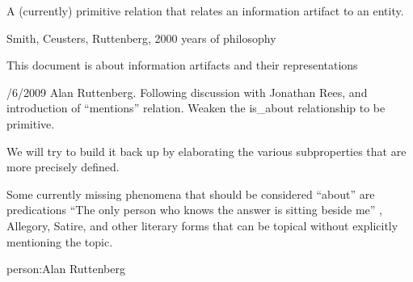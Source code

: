 \documentclass[letterpaper,10pt,english]{sphinxmanual}
\begin{document}
\begin{sphinxShadowBox}

\sphinxAtStartPar
{}
\end{sphinxShadowBox}

\begin{sphinxShadowBox}

\sphinxAtStartPar
A (currently) primitive relation that relates an information artifact to an entity.
\end{sphinxShadowBox}

\begin{sphinxShadowBox}

\sphinxAtStartPar
Smith, Ceusters, Ruttenberg, 2000 years of philosophy
\end{sphinxShadowBox}

\begin{sphinxShadowBox}

\sphinxAtStartPar
This document is about information artifacts and their representations
\end{sphinxShadowBox}

\begin{sphinxShadowBox}

/6/2009 Alan Ruttenberg. Following discussion with Jonathan Rees, and introduction of “mentions” relation. Weaken the is\_about relationship to be primitive.

\sphinxAtStartPar
We will try to build it back up by elaborating the various subproperties that are more precisely defined.

\sphinxAtStartPar
Some currently missing phenomena that should be considered “about” are predications \sphinxhyphen{} “The only person who knows the answer is sitting beside me” , Allegory, Satire, and other literary forms that can be topical without explicitly mentioning the topic.
\end{sphinxShadowBox}

\begin{sphinxShadowBox}

\sphinxAtStartPar
{}
\end{sphinxShadowBox}

\begin{sphinxShadowBox}

\sphinxAtStartPar
person:Alan Ruttenberg
\end{sphinxShadowBox}
\begin{quote}

\ignorespaces \end{quote}
\end{document}
